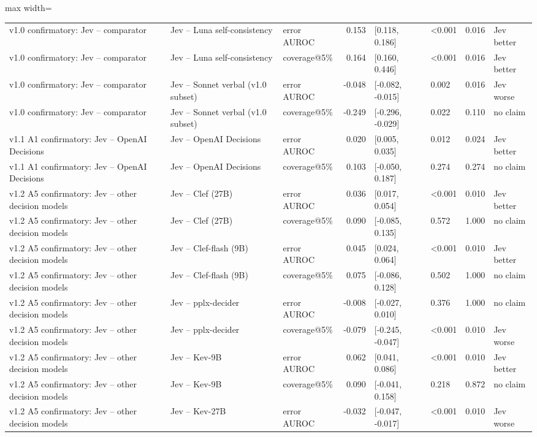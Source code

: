 \begin{table}[t]
\begin{adjustbox}{max width=\linewidth}
\begin{tabular}{lllrllll}
v1.0 confirmatory: Jev -- comparator & Jev -- Luna self-consistency & error AUROC & 0.153 & [0.118, 0.186] & <0.001 & 0.016 & Jev better \\
v1.0 confirmatory: Jev -- comparator & Jev -- Luna self-consistency & coverage@5\% & 0.164 & [0.160, 0.446] & <0.001 & 0.016 & Jev better \\
v1.0 confirmatory: Jev -- comparator & Jev -- Sonnet verbal (v1.0 subset) & error AUROC & -0.048 & [-0.082, -0.015] & 0.002 & 0.016 & Jev worse \\
v1.0 confirmatory: Jev -- comparator & Jev -- Sonnet verbal (v1.0 subset) & coverage@5\% & -0.249 & [-0.296, -0.029] & 0.022 & 0.110 & no claim \\
v1.1 A1 confirmatory: Jev -- OpenAI Decisions & Jev -- OpenAI Decisions & error AUROC & 0.020 & [0.005, 0.035] & 0.012 & 0.024 & Jev better \\
v1.1 A1 confirmatory: Jev -- OpenAI Decisions & Jev -- OpenAI Decisions & coverage@5\% & 0.103 & [-0.050, 0.187] & 0.274 & 0.274 & no claim \\
v1.2 A5 confirmatory: Jev -- other decision models & Jev -- Clef (27B) & error AUROC & 0.036 & [0.017, 0.054] & <0.001 & 0.010 & Jev better \\
v1.2 A5 confirmatory: Jev -- other decision models & Jev -- Clef (27B) & coverage@5\% & 0.090 & [-0.085, 0.135] & 0.572 & 1.000 & no claim \\
v1.2 A5 confirmatory: Jev -- other decision models & Jev -- Clef-flash (9B) & error AUROC & 0.045 & [0.024, 0.064] & <0.001 & 0.010 & Jev better \\
v1.2 A5 confirmatory: Jev -- other decision models & Jev -- Clef-flash (9B) & coverage@5\% & 0.075 & [-0.086, 0.128] & 0.502 & 1.000 & no claim \\
v1.2 A5 confirmatory: Jev -- other decision models & Jev -- pplx-decider & error AUROC & -0.008 & [-0.027, 0.010] & 0.376 & 1.000 & no claim \\
v1.2 A5 confirmatory: Jev -- other decision models & Jev -- pplx-decider & coverage@5\% & -0.079 & [-0.245, -0.047] & <0.001 & 0.010 & Jev worse \\
v1.2 A5 confirmatory: Jev -- other decision models & Jev -- Kev-9B & error AUROC & 0.062 & [0.041, 0.086] & <0.001 & 0.010 & Jev better \\
v1.2 A5 confirmatory: Jev -- other decision models & Jev -- Kev-9B & coverage@5\% & 0.090 & [-0.041, 0.158] & 0.218 & 0.872 & no claim \\
v1.2 A5 confirmatory: Jev -- other decision models & Jev -- Kev-27B & error AUROC & -0.032 & [-0.047, -0.017] & <0.001 & 0.010 & Jev worse \\

\end{tabular}
\end{adjustbox}
\end{table}
